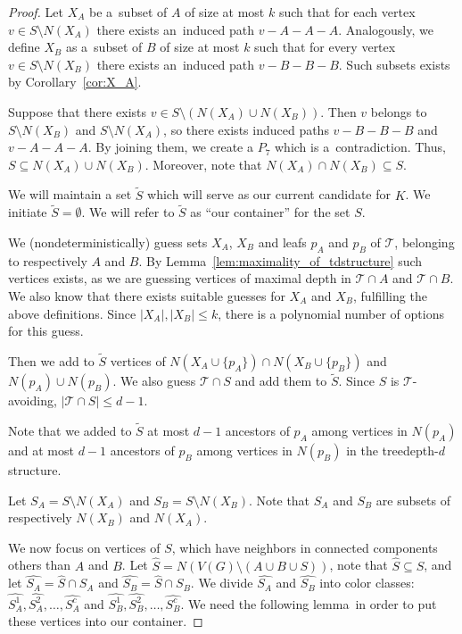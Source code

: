 \documentclass[11pt,a4paper]{article}
\theoremstyle{definition}
\renewcommand{\varnothing}{\emptyset}
\def\T{\mathcal{T}}
\begin{document}
\begin{proof}
Let $X_A$ be a~subset of $A$ of size at most $k$ such that for each vertex $v\in S\setminus N(X_A)$ there exists an~induced path $v-A-A-A$. Analogously, we define $X_B$ as a~subset of $B$ of size at most $k$ such that for every vertex $v\in S\setminus N(X_B)$ there exists an~induced path $v-B-B-B$. Such subsets exists by Corollary~\ref{cor:X_A}. 

Suppose that there exists $v\in S\setminus (N(X_A)\cup N(X_B))$. Then $v$ belongs to $S\setminus N(X_B)$ and $S\setminus N(X_A)$, so there exists induced paths $v-B-B-B$ and $v-A-A-A$. By joining them, we create a $P_7$ which is a~contradiction. Thus, $S\subseteq N(X_A)\cup N(X_B)$. Moreover, note that $N(X_A)\cap N(X_B)\subseteq S$.

We will maintain a set $\widetilde{S}$ which will serve as our current candidate for $K$.
We initiate $\widetilde{S}=\varnothing$. We will refer to $\widetilde{S}$ as ``our container'' for the set $S$. 

We (nondeterministically) guess sets $X_A$, $X_B$ and leafs $p_A$ and $p_B$ of $\T$, belonging to respectively $A$ and $B$. By Lemma~\ref{lem:maximality_of_tdstructure} such vertices exists, as we are guessing vertices of maximal depth in $\T\cap A$ and $\T\cap B$. We also know that there exists suitable guesses for $X_A$ and $X_B$, fulfilling the above definitions.
Since $|X_A|,|X_B| \leq k$, there is a polynomial number of options for this guess.

Then we add to $\widetilde{S}$ vertices of $N(X_A\cup\{p_A\})\cap N(X_B\cup \{p_B\})$ and $N(p_A)\cup N(p_B)$. We also guess $\T\cap S$ and add them to $\widetilde{S}$. Since $S$ is $\T$-avoiding, $|\T \cap S| \leq d-1$.

Note that we added to $\widetilde{S}$ at most $d-1$ ancestors of $p_A$ among vertices in $N(p_A)$ and at most $d-1$ ancestors of $p_B$ among vertices in $N(p_B)$ in the treedepth-$d$ structure.

Let $S_A=S\setminus N(X_A)$ and $S_B=S\setminus N(X_B)$. Note that $S_A$ and $S_B$ are subsets of respectively $N(X_B)$ and $N(X_A)$.

We now focus on vertices of $S$, which have neighbors in connected components others than $A$ and $B$. Let $\widehat{S}=N(V(G) \setminus (A\cup B\cup S))$,
note that $\widehat{S} \subseteq S$, and let $\widehat{S_A}=\widehat{S}\cap S_A$ and $\widehat{S_B}=\widehat{S}\cap S_B$. We divide $\widehat{S_A}$ and $\widehat{S_B}$ into color classes: $\widehat{S_A^1},\widehat{S_A^2}, \dots, \widehat{S_A^c}$ and  $\widehat{S_B^1},\widehat{S_B^2}, \dots, \widehat{S_B^c}$. We need the following lemma~in order to put these vertices into our container. 


\end{proof}
\end{document}
